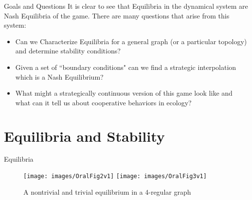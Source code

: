 \documentclass{beamer}
\begin{document}
\begin{frame}{Goals and Questions}
	It is clear to see that Equilibria in the dynamical system are Nash Equilibria of the game. There are many questions that arise from this system:
	\begin{itemize}
		\item Can we Characterize Equilibria for a general graph (or a particular topology) and determine stability conditions?
		
		\item Given a set of ``boundary conditions" can we find a strategic interpolation which is a Nash Equilibrium?
		
		\item What might a strategically continuous version of this game look like and what can it tell us about cooperative behaviors in ecology?
	\end{itemize}
\end{frame}
\section{Equilibria and Stability}
\begin{frame}{Equilibria}
	\begin{figure}
		\texttt{[image: images/OralFig2v1]}
		\texttt{[image: images/OralFig3v1]}
		\caption{A nontrivial and trivial equilibrium in a 4-regular graph}
	\end{figure}
\end{frame}
\end{document}
